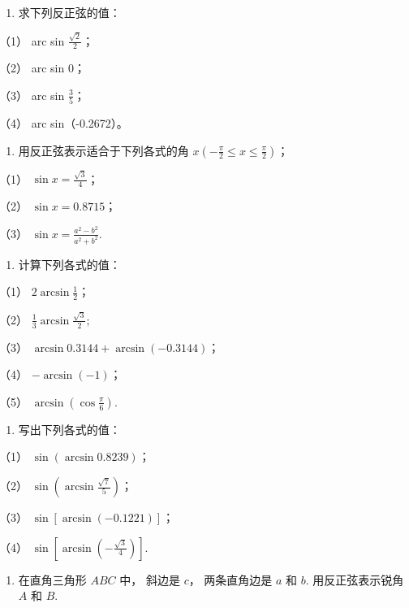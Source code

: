 \begin{enumerate}
\item
  求下列反正弦的值：
\end{enumerate}

（1） arc sin \(\frac{\sqrt{2}}{2}\)；

（2） arc sin 0；

（3） arc sin \(\frac{3}{5}\)；

（4） arc sin（-0.2672）。

\begin{enumerate}[start=2]
\item
  用反正弦表示适合于下列各式的角
  \(x\left(-\frac{\pi}{2} \leqslant x \leqslant \frac{\pi}{2}\right)\)；
\end{enumerate}

（1） \(\sin x = \frac{\sqrt{3}}{4}\)；

（2） \(\sin x = 0.8715\)；

（3） \(\sin x = \frac{a^2 - b^2}{a^2 + b^2}\).

\begin{enumerate}[start=3]
\item
  计算下列各式的值：
\end{enumerate}

（1） \(2\arcsin \frac{1}{2}\)；

（2） \(\frac{1}{3}\arcsin \frac{\sqrt{3}}{2};\)

（3） \(\arcsin 0.3144 + \arcsin (-0.3144)\)；

（4） \(-\arcsin (-1)\)；

（5） \(\arcsin \left(\cos \frac{\pi}{6}\right)\).

\begin{enumerate}[start=4]
\item
  写出下列各式的值：
\end{enumerate}

（1） \(\sin (\arcsin 0.8239)\)；

（2） \(\sin \left(\arcsin \frac{\sqrt{7}}{5}\right)\)；

（3） \(\sin [\arcsin (-0.1221)]\)；

（4） \(\sin \left[\arcsin \left(-\frac{\sqrt{3}}{4}\right)\right]\).

\begin{enumerate}[start=5]
\item
  在直角三角形 \(ABC\) 中， 斜边是 \(c\)， 两条直角边是 \(a\) 和 \(b\).
  用反正弦表示锐角 \(A\) 和 \(B\).
\end{enumerate}

